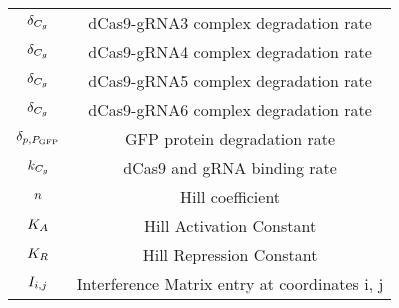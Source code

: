 \begin{center}
\begin{tabular}{|c|c|}
        $\delta_{C_g}{}$ & dCas9-gRNA3 complex degradation rate \\
        $\delta_{C_g}{}$ & dCas9-gRNA4 complex degradation rate \\
        $\delta_{C_g}{}$ & dCas9-gRNA5 complex degradation rate \\
        $\delta_{C_g}{}$ & dCas9-gRNA6 complex degradation rate \\
        $\delta_{p,P_{\text{GFP}}}$ & GFP protein degradation rate \\
        $k_{C_g}{}$ & dCas9 and gRNA binding rate \\
        $n$ & Hill coefficient \\
        $K_A$ & Hill Activation Constant \\
        $K_R$ & Hill Repression Constant \\
        $I_{i,j}$ & Interference Matrix entry at coordinates i, j \\\hline
    \end{tabular}
    \end{center}